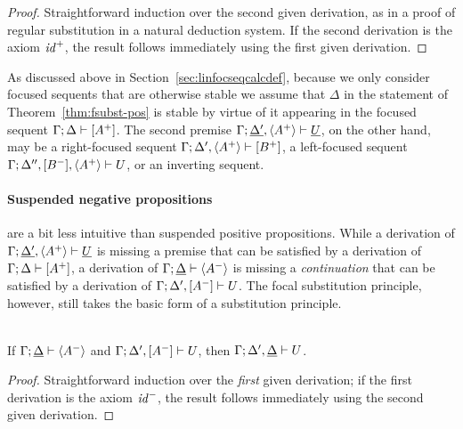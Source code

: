 \begin{proof}
  Straightforward induction over the second given derivation, as in a
  proof of regular substitution in a natural deduction system. If the
  second derivation is the axiom ${\it id}^+$, the result follows
  immediately using the first given derivation.
\end{proof}

\noindent
As discussed above in Section~\ref{sec:linfocseqcalcdef}, because we
only consider focused sequents that are otherwise stable we assume
that $\Delta$ in the statement of Theorem~\ref{thm:fsubst-pos} is
stable by virtue of it appearing in the focused sequent
${\Gamma};{\Delta} \vdash {[A^+]} \mathstrut$. The second premise
${\Gamma};{\underline{\Delta'}, \langle A^+
  \rangle} \vdash {\underline{U}} \mathstrut$, on the other hand, may be a right-focused
sequent ${\Gamma};{\Delta', \langle A^+ \rangle} \vdash {[B^+]} \mathstrut$, a
left-focused sequent ${\Gamma};{\Delta'', [B^-], \langle A^+
  \rangle} \vdash {U} \mathstrut$, or an inverting sequent.

\paragraph{Suspended negative propositions} are a bit less intuitive
than suspended positive propositions. While a derivation of
${\Gamma};{\underline{\Delta'}, \langle A^+
  \rangle} \vdash {\underline{U}} \mathstrut$ is missing a premise that can be satisfied
by a derivation of ${\Gamma};{\Delta} \vdash {[A^+]} \mathstrut$, a derivation of
${\Gamma};{\underline{\Delta}} \vdash {\langle A^- \rangle} \mathstrut$ is missing
a {\it continuation} that can be satisfied by a derivation of
${\Gamma};{\Delta', [A^-]} \vdash {U} \mathstrut$. The focal substitution
principle, however, still takes the basic form of a substitution
principle.

\bigskip
\begin{theorem}\label{thm:fsubst-neg}~\\
If ${\Gamma};{\underline{\Delta}} \vdash {\langle A^- \rangle} \mathstrut$
and ${\Gamma};{\Delta', [A^-]} \vdash {U} \mathstrut$, 
then ${\Gamma};{\Delta', \underline{\Delta}} \vdash {U} \mathstrut$. 
\end{theorem}

\begin{proof}
  Straightforward induction over the {\it first} given derivation; if
  the first derivation is the axiom ${\it id}^-$, the result follows
  immediately using the second given derivation.
\end{proof}

